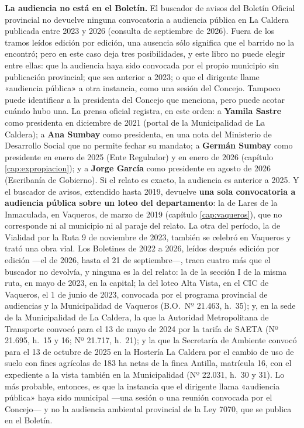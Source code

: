 \begin{cautela}
\textbf{La audiencia no está en el Boletín.} El buscador de avisos del Boletín Oficial provincial no devuelve ninguna convocatoria a audiencia pública en La Caldera publicada entre 2023 y 2026 (consulta de septiembre de 2026). Fuera de los tramos leídos edición por edición, una ausencia sólo significa que el barrido no la encontró; pero en este caso deja tres posibilidades, y este libro no puede elegir entre ellas: que la audiencia haya sido convocada por el propio municipio sin publicación provincial; que sea anterior a 2023; o que el dirigente llame «audiencia pública» a otra instancia, como una sesión del Concejo. Tampoco puede identificar a la presidenta del Concejo que menciona, pero puede acotar cuándo hubo una. La prensa oficial registra, en este orden: a \textbf{Yamila Sastre} como presidenta en diciembre de 2021 (portal de la Municipalidad de La Caldera); a \textbf{Ana Sumbay} como presidenta, en una nota del Ministerio de Desarrollo Social que no permite fechar su mandato; a \textbf{Germán Sumbay} como presidente en enero de 2025 (Ente Regulador) y en enero de 2026 (capítulo \ref{cap:expropiacion}); y a \textbf{Jorge García} como presidente en agosto de 2026 (Escribanía de Gobierno). Si el relato es exacto, la audiencia es anterior a 2025. Y el buscador de avisos, extendido hasta 2019, devuelve \textbf{una sola convocatoria a audiencia pública sobre un loteo del departamento}: la de Lares de la Inmaculada, en Vaqueros, de marzo de 2019 (capítulo \ref{cap:vaqueros}), que no corresponde ni al municipio ni al paraje del relato. La otra del período, la de Vialidad por la Ruta 9 de noviembre de 2023, también se celebró en Vaqueros y trató una obra vial. Los Boletines de 2022 a 2026, leídos después edición por edición ---el de 2026, hasta el 21 de septiembre---, traen cuatro más que el buscador no devolvía, y ninguna es la del relato: la de la sección I de la misma ruta, en mayo de 2023, en la capital; la del loteo Alta Vista, en el CIC de Vaqueros, el 1 de junio de 2023, convocada por el programa provincial de audiencias y la Municipalidad de Vaqueros (B.O.\ Nº 21.463, h.\ 35); y, en la sede de la Municipalidad de La Caldera, la que la Autoridad Metropolitana de Transporte convocó para el 13 de mayo de 2024 por la tarifa de SAETA (Nº 21.695, h.\ 15 y 16; Nº 21.717, h.\ 21); y la que la Secretaría de Ambiente convocó para el 13 de octubre de 2025 en la Hostería La Caldera por el cambio de uso de suelo con fines agrícolas de 183 ha netas de la finca Antilla, matrícula 16, con el expediente a la vista también en la Municipalidad (Nº 22.031, h.\ 30 y 31). Lo más probable, entonces, es que la instancia que el dirigente llama «audiencia pública» haya sido municipal ---una sesión o una reunión convocada por el Concejo--- y no la audiencia ambiental provincial de la Ley 7070, que se publica en el Boletín. 
\end{cautela}

